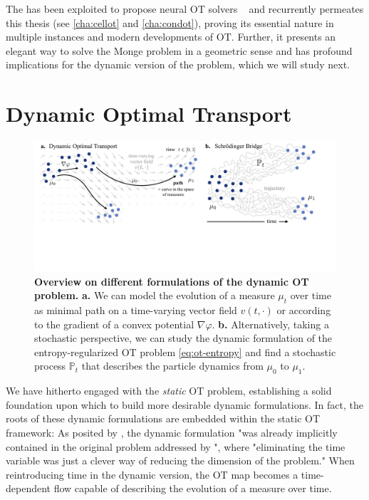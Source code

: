 The  has been exploited to propose neural \acrshort{OT} solvers ~\citep{taghvaei20192, makkuva2020optimal, korotin2021wasserstein, bunne2022proximal, alvarez2021optimizing, mokrov2021large, amos2023amortizing} and recurrently permeates this thesis (see  \cref{cha:cellot} and \ref{cha:condot}), proving its essential nature in multiple instances and modern developments of \acrlong{OT}.
Further, it presents an elegant way to solve the Monge problem in a geometric sense and has profound implications for the dynamic version of the problem, which we will study next.


\section{Dynamic Optimal Transport} \label{sec:background_ot_dynamic}

\begin{figure}[t]
  \includegraphics[width=\textwidth]{figures/fig_dynamic_ot_background.pdf}
  \caption{ \textbf{Overview on different formulations of the dynamic \acrshort{OT} problem.} \textbf{a.} We can model the evolution of a measure $\mu_t$ over time as minimal path on a time-varying vector field $v(t, \cdot)$ or according to the gradient of a convex potential $\nabla \varphi$. \textbf{b.} Alternatively, taking a stochastic perspective, we can study the dynamic formulation of the entropy-regularized \acrshort{OT} problem \eqref{eq:ot-entropy} and find a stochastic process $\mathbb{P}_t$ that describes the particle dynamics from $\mu_0$ to $\mu_1$.}	
  \label{fig:dynamic_ot_background}
\end{figure}

We have hitherto engaged with the \emph{static} \acrlong{OT} problem, establishing a solid foundation upon which to build more desirable dynamic formulations. In fact, the roots of these dynamic formulations are embedded within the static \acrshort{OT} framework: As posited by \citet{benamou2000computational}, the dynamic formulation "was already implicitly contained in the original problem addressed by \citeauthor{monge1781histoire}", where "eliminating the time variable was just a clever way of reducing the dimension of the problem." When reintroducing time in the dynamic version, the \acrlong{OT} map becomes a time-dependent flow capable of describing the evolution of a measure over time.


